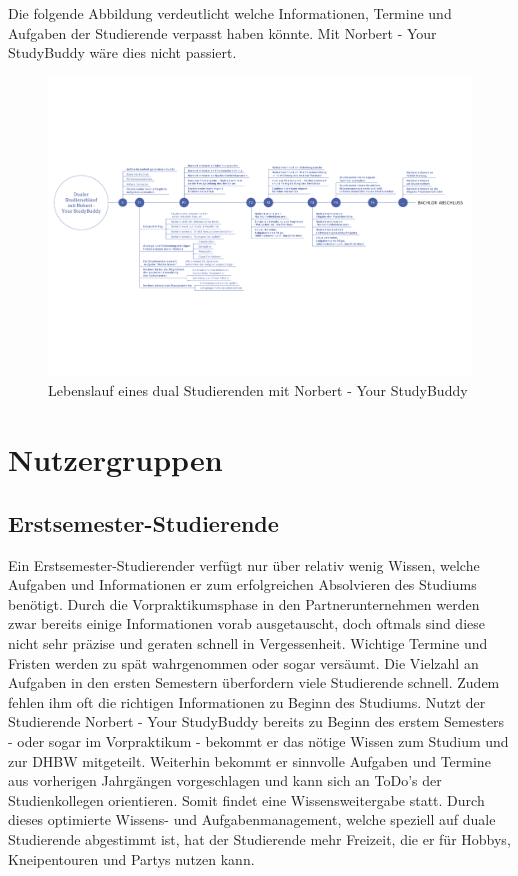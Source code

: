Die folgende Abbildung verdeutlicht welche Informationen, Termine und Aufgaben der Studierende verpasst haben könnte. Mit Norbert - Your StudyBuddy wäre dies nicht passiert.

\newpage
\begin{landscape}
\vspace*{35mm}
	\begin{figure}[H]
	\centering
	\includegraphics[scale=0.75]{images/timeline.pdf}
	\caption{Lebenslauf eines dual Studierenden mit Norbert - Your StudyBuddy}
	\end{figure}
	
\end{landscape}
\newpage

\section{Nutzergruppen}

\subsection{Erstsemester-Studierende}
Ein Erstsemester-Studierender verfügt nur über relativ wenig Wissen, welche Aufgaben und Informationen er zum erfolgreichen Absolvieren des Studiums benötigt. Durch die Vorpraktikumsphase in den Partnerunternehmen werden zwar bereits einige Informationen vorab ausgetauscht, doch oftmals sind diese nicht sehr präzise und geraten schnell in Vergessenheit. Wichtige Termine und Fristen werden zu spät wahrgenommen oder sogar versäumt. Die Vielzahl an Aufgaben in den ersten Semestern überfordern viele Studierende schnell. Zudem fehlen ihm oft die richtigen Informationen zu Beginn des Studiums. Nutzt der Studierende Norbert - Your StudyBuddy bereits zu Beginn des erstem Semesters - oder sogar im Vorpraktikum - bekommt er  das nötige Wissen zum Studium und zur DHBW mitgeteilt. Weiterhin bekommt er sinnvolle Aufgaben und Termine aus vorherigen Jahrgängen vorgeschlagen und kann sich an ToDo's der Studienkollegen orientieren. Somit findet eine Wissensweitergabe statt. Durch dieses optimierte Wissens- und Aufgabenmanagement, welche speziell auf duale Studierende abgestimmt ist, hat der Studierende mehr Freizeit, die er für Hobbys, Kneipentouren und Partys nutzen kann.


